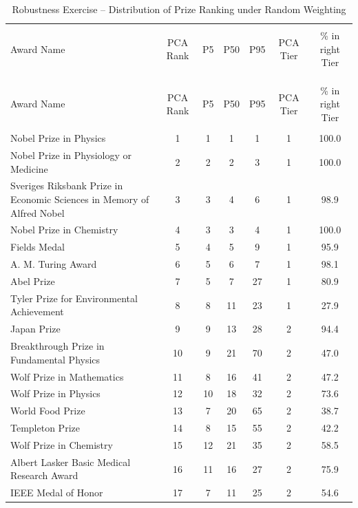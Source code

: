 \begingroup\small\setlength{\tabcolsep}{4pt} \begin{longtable}{>{\raggedright\arraybackslash}p{6.6cm}cccccc} \caption{Robustness Exercise -- Distribution of Prize Ranking under Random Weighting} \label{mainRankingRobustness} 
\\[-1.8ex]\hline 
\hline \\[-1.8ex] 
Award Name & PCA Rank & P5 & P50 & P95 & PCA Tier & \% in right Tier \\ 
\hline \\[-1.8ex] 
\endfirsthead
\multicolumn{7}{l}{\small\textit{(Table~\ref{mainRankingRobustness} continued)}} \\[2pt]
\hline \hline \\[-1.8ex]
Award Name & PCA Rank & P5 & P50 & P95 & PCA Tier & \% in right Tier \\ 
\hline \\[-1.8ex] 
\endhead
Nobel Prize in Physics & 1 & 1 & 1 & 1 & 1 & 100.0 \\ 
Nobel Prize in Physiology or Medicine & 2 & 2 & 2 & 3 & 1 & 100.0 \\ 
Sveriges Riksbank Prize in Economic Sciences in Memory of Alfred Nobel & 3 & 3 & 4 & 6 & 1 & 98.9 \\ 
Nobel Prize in Chemistry & 4 & 3 & 3 & 4 & 1 & 100.0 \\ 
Fields Medal & 5 & 4 & 5 & 9 & 1 & 95.9 \\ 
A. M. Turing Award & 6 & 5 & 6 & 7 & 1 & 98.1 \\ 
Abel Prize & 7 & 5 & 7 & 27 & 1 & 80.9 \\ 
Tyler Prize for Environmental Achievement & 8 & 8 & 11 & 23 & 1 & 27.9 \\ 
Japan Prize & 9 & 9 & 13 & 28 & 2 & 94.4 \\ 
Breakthrough Prize in Fundamental Physics & 10 & 9 & 21 & 70 & 2 & 47.0 \\ 
Wolf Prize in Mathematics & 11 & 8 & 16 & 41 & 2 & 47.2 \\ 
Wolf Prize in Physics & 12 & 10 & 18 & 32 & 2 & 73.6 \\ 
World Food Prize & 13 & 7 & 20 & 65 & 2 & 38.7 \\ 
Templeton Prize & 14 & 8 & 15 & 55 & 2 & 42.2 \\ 
Wolf Prize in Chemistry & 15 & 12 & 21 & 35 & 2 & 58.5 \\ 
Albert Lasker Basic Medical Research Award & 16 & 11 & 16 & 27 & 2 & 75.9 \\ 
IEEE Medal of Honor & 17 & 7 & 11 & 25 & 2 & 54.6 \\ 

\end{longtable}
